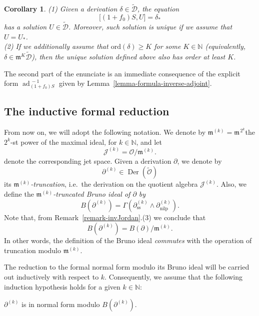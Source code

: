 \documentclass[10pt,twoside,reqno]{amsart}
\newtheorem{corollary}[thm]{Corollary}
\theoremstyle{remark}
\theoremstyle{remark}
\newcommand{\ad}{\operatorname{ad}}
\newcommand{\ku}{^{(k)}}
\newcommand{\tmmathbf}[1]{{\boldsymbol{#1}}}
\newcommand{\tmop}[1]{{\operatorname{#1}}}
\newcommand{\ord}{\mathrm{ord}}
\newcommand{\tO}{\widetilde{\mathcal{O}}}
\newcommand{\cD}{\mathcal{D}}
\newcommand{\tcD}{\widetilde{\cD}}
\begin{document}
\begin{corollary}\label{cor-uniquesol-cohomological-eq}
(1) Given a derivation $\delta \in \tcD$, the equation
$$\big[ (1+f_0) S,U \big]=\delta_\ast$$
has a solution $U \in \tcD$. Moreover, such solution is unique if we assume that $U=U_\ast$. \\
\noindent (2) If we additionally assume that $\ord(\delta) \ge K$ for some $K \in \mathbb{N}$ (equivalently, $\delta \in \mathfrak{m}^{K} \tcD$), then the unique solution defined above also has order at least $K$. 
\end{corollary}
The second part of the enunciate is an immediate consequence of the explicit form $\ad_{(1+f_0)S}^{\,-1}$ given by Lemma~\ref{lemma-formula-inverse-adjoint}.
\subsection{The inductive formal reduction}
From now on, we will adopt the following notation. We denote by $\mathfrak{m}^{(k)} = \mathfrak{m}^{\,2^{k}}$the $2^{k}$-st power of the maximal ideal, for $k \in \mathbb{N}$, and let
$$
\mathcal{J}^{(k)} = \mathcal{O} \big/ \mathfrak{m}^{(k)} .
$$
denote the corresponding jet space. Given a derivation $\partial$, we denote by
$$\partial^{(k)}\in \tmop{Der}\left( \tO \right)$$  
its {\em $\mathfrak{m}^{(k)}$-truncation}, i.e.~the derivation on the quotient algebra $\mathcal{J}^{(k)}$. Also, we define the {\em $\mathfrak{m}^{(k)}$-truncated Bruno ideal of $\partial$ by}
$$B(\partial^{(k)})= \Gamma (\partial_{\tmop{ss}}^{(k)} \wedge
     \partial_{\tmop{nilp}}^{(k)}).$$
Note that, from Remark~\ref{remark-invJordan}.(3)  we conclude that  
$$B(\partial^{(k)}) = B (\partial) / \mathfrak{m}^{(k)}.$$
In other words, the definition of the Bruno ideal {\em commutes} with the operation of truncation modulo $\mathfrak{m}^{(k)}$.  

The reduction to the formal normal form modulo its Bruno ideal will be carried out inductively with respect to $k$. Consequently, we assume that the following induction hypothesis holds for a given $k\in \mathbb{N}$:

\vspace{0.5cm}
\noindent {\bf Hypothesis $(\tmmathbf{H}_k)$ } $\partial\ku$ is in normal form modulo $B (\partial^{(k)})$.
\vspace{0.5cm}
\end{document}
